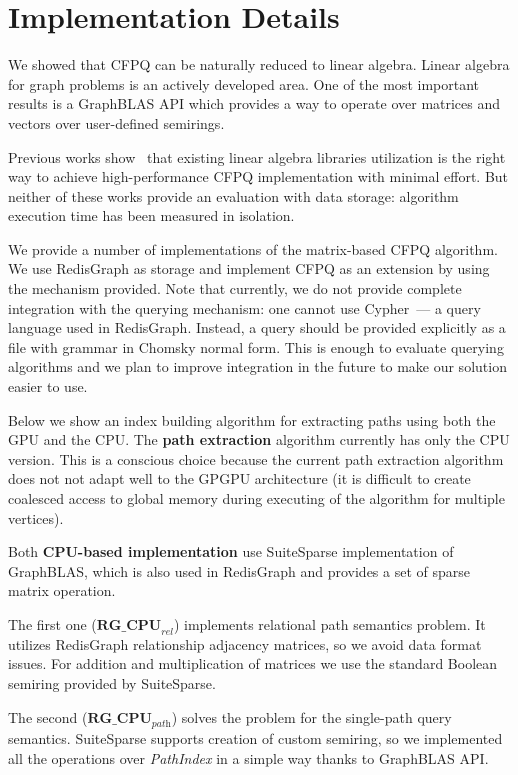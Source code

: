 \section{Implementation Details}

We showed that CFPQ can be naturally reduced to linear algebra.
Linear algebra for graph problems is an actively developed area.
One of the most important results is a GraphBLAS API which provides a way to operate over matrices and vectors over user-defined semirings.

Previous works show~\cite{Mishin:2019:ECP:3327964.3328503, Azimov:2018:CPQ:3210259.3210264} that existing linear algebra libraries utilization is the right way to achieve high-performance CFPQ implementation with minimal effort.
But neither of these works provide an evaluation with data storage: algorithm execution time has been measured in isolation.

We provide a number of implementations of the matrix-based CFPQ algorithm.
We use RedisGraph as storage and implement CFPQ as an extension by using the mechanism provided.
Note that currently, we do not provide complete integration with the querying mechanism: one cannot use Cypher~--- a query language used in RedisGraph.
Instead, a query should be provided explicitly as a file with grammar in Chomsky normal form.
This is enough to evaluate querying algorithms and we plan to improve integration in the future to make our solution easier to use. 

Below we show an index building algorithm for extracting paths using both the GPU and the CPU. The \textbf{path extraction} algorithm currently has only the CPU version. This is a conscious choice because the current path extraction algorithm does not not adapt well to the GPGPU architecture (it is difficult to create coalesced access to global memory during executing of the algorithm for multiple vertices).

Both \textbf{CPU-based implementation} use SuiteSparse implementation of GraphBLAS, which is also used in RedisGraph and provides a set of sparse matrix operation.

The first one ($\textbf{RG\_CPU}_{\textit{rel}}$) implements relational path semantics problem. It utilizes RedisGraph relationship adjacency matrices, so we avoid data format issues. For addition and multiplication of matrices we use the standard Boolean semiring provided by SuiteSparse.

The second ($\textbf{RG\_CPU}_{\textit{path}}$) solves the problem for the single-path query semantics. SuiteSparse supports creation of custom semiring, so we implemented all the operations over \textit{PathIndex} in a simple way thanks to GraphBLAS API.

